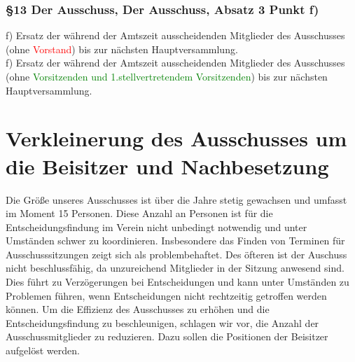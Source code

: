 \documentclass[10pt,a4paper,parskip=half]{scrartcl}
\newcommand{\new}[1]{\textcolor{Green}{#1}}
\newcommand{\old}[1]{\textcolor{Red}{#1}}
\newcommand{\change}[1]{
  \begin{adjustwidth}{20pt}{20pt}
    #1
  \end{adjustwidth}
}
\newcommand{\compare}[3]{\change{\subsubsection*{#1}\begin{multicols}{2}#2\columnbreak\\#3\end{multicols}}}
\begin{document}
\compare{§13 Der Ausschuss, Der Ausschuss, Absatz 3 Punkt f)}
{f) Ersatz der während der Amtszeit ausscheidenden Mitglieder des Ausschusses (ohne \old{Vorstand}) bis zur nächsten Hauptversammlung.}
{f) Ersatz der während der Amtszeit ausscheidenden Mitglieder des Ausschusses (ohne \new{Vorsitzenden und 1.stellvertretendem Vorsitzenden}) bis zur nächsten Hauptversammlung.}


\clearpage
\section{Verkleinerung des Ausschusses um die Beisitzer und Nachbesetzung}
Die Größe unseres Ausschusses ist über die Jahre stetig gewachsen und umfasst im Moment 15 Personen. Diese Anzahl an Personen ist für die Entscheidungsfindung im Verein nicht unbedingt notwendig und unter Umständen schwer zu koordinieren. Insbesondere das Finden von Terminen für Ausschusssitzungen zeigt sich als problembehaftet. Des öfteren ist der Auschuss nicht beschlussfähig, da unzureichend Mitglieder in der Sitzung anwesend sind. Dies führt zu Verzögerungen bei Entscheidungen und kann unter Umständen zu Problemen führen, wenn Entscheidungen nicht rechtzeitig getroffen werden können. Um die Effizienz des Ausschusses zu erhöhen und die Entscheidungsfindung zu beschleunigen, schlagen wir vor, die Anzahl der Ausschussmitglieder zu reduzieren. Dazu sollen die Positionen der Beisitzer aufgelöst werden.
\end{document}
